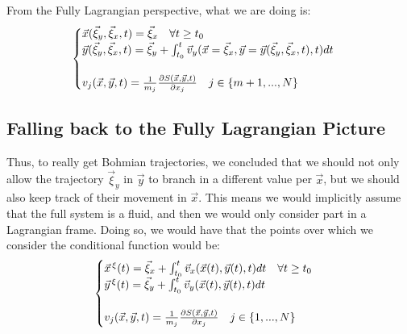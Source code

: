 \documentclass[11pt, a4paper]{article} %
\DeclareRobustCommand{\mybox}[2][gray!10]{%
\begin{tcolorbox}[   %
        left=0.2cm,
        right=0.2cm,
        top=0.15cm,
        bottom=0.15cm,
        colback=#1,
        colframe=#1,
        width=\dimexpr\textwidth\relax, 
        enlarge left by=0mm,
        boxsep=5pt,
        arc=0pt,outer arc=0pt,
        ]
        #2
\end{tcolorbox}
}
\begin{document}
\mybox{
From the Fully Lagrangian perspective, what we are doing is:
\begin{equation}\label{a}
\begin{cases}
\vec{x}(\vec{\xi}_y, \vec{\xi}_x,t)=\vec{\xi}_x \quad \forall t\geq t_0\\
\vec{y}(\vec{\xi}_y, \vec{\xi}_x,t)=\vec{\xi}_y+\int_{t_0}^t \vec{v}_y(\vec{x}=\vec{\xi}_x, \vec{y}=\vec{y}(\vec{\xi}_y, \vec{\xi}_x,t),t)dt\\ \\
v_j(\vec{x}, \vec{y},t)=\frac{1}{m_j}\pdv{S(\vec{x}, \vec{y},t)}{x_j}\quad j\in\{m+1,...,N \}
\end{cases}
\end{equation}


\subsection*{Falling back to the Fully Lagrangian Picture}
Thus, to really get Bohmian trajectories, we concluded that we should not only allow the trajectory $\vec{\xi}_y$ in $\vec{y}$ to branch in a different value per $\vec{x}$, but we should also keep track of their movement in $\vec{x}$. This means we would implicitly assume that the full system is a fluid, and then we would only consider part in a Lagrangian frame. Doing so, we would have that the points over which we consider the conditional function would be:
\begin{equation}
\begin{cases}\label{b}
\vec{x}^{\, \xi}(t)=\vec{\xi}_x +\int_{t_0}^t \vec{v}_x(\vec{x}(t), \vec{y}(t),t)dt\quad \forall t\geq t_0\\
\vec{y}^{\, \xi}(t)=\vec{\xi}_y+\int_{t_0}^t \vec{v}_y(\vec{x}(t), \vec{y}(t),t)dt\\ \\
v_j(\vec{x}, \vec{y},t)=\frac{1}{m_j}\pdv{S(\vec{x}, \vec{y},t)}{x_j}\quad j\in\{1,...,N \}
\end{cases}
\end{equation}


}
\end{document}
